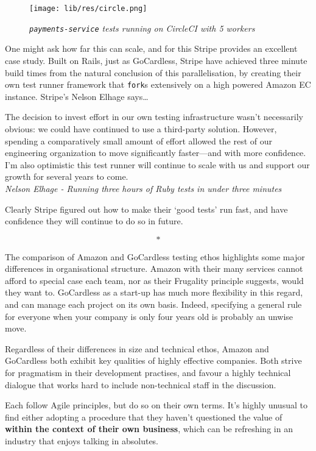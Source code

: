 \documentclass[11pt]{article}
\begin{document}
\begin{figure}
\centering
\texttt{[image: lib/res/circle.png]}
\caption{\label{fig:circle}\textit{\texttt{payments-service} tests running on
CircleCI with 5 workers}}
\end{figure}

One might ask how far this can scale, and for this Stripe provides an excellent
case study. Built on Rails, just as GoCardless, Stripe have achieved three
minute build times from the natural conclusion of this parallelisation, by
creating their own test runner framework that \texttt{fork}s extensively on a
high powered Amazon EC instance. Stripe's Nelson Elhage says\dots

\begin{displayquote}

  The decision to invest effort in our own testing infrastructure wasn't
  necessarily obvious: we could have continued to use a third-party solution.
  However, spending a comparatively small amount of effort allowed the rest of our
  engineering organization to move significantly faster—and with more confidence.
  I'm also optimistic this test runner will continue to scale with us and support
  our growth for several years to come.\\

  \textit{Nelson Elhage - Running three hours of Ruby tests in under three
  minutes~\cite{stripeDistributedTesting}}

\end{displayquote}

Clearly Stripe figured out how to make their `good tests' run fast, and have
confidence they will continue to do so in future.

\[*\]

The comparison of Amazon and GoCardless testing ethos highlights some major
differences in organisational structure. Amazon with their many services cannot
afford to special case each team, nor as their Frugality principle suggests,
would they want to. GoCardless as a start-up has much more flexibility in this
regard, and can manage each project on its own basis. Indeed, specifying a
general rule for everyone when your company is only four years old is probably
an unwise move.

Regardless of their differences in size and technical ethos, Amazon and
GoCardless both exhibit key qualities of highly effective companies. Both strive
for pragmatism in their development practises, and favour a highly technical
dialogue that works hard to include non-technical staff in the discussion.

Each follow Agile principles, but do so on their own terms. It's highly unusual
to find either adopting a procedure that they haven't questioned the value of
\textbf{within the context of their own business}, which can be refreshing in an
industry that enjoys talking in absolutes.



\medskip
{}

\newpage
\end{document}
